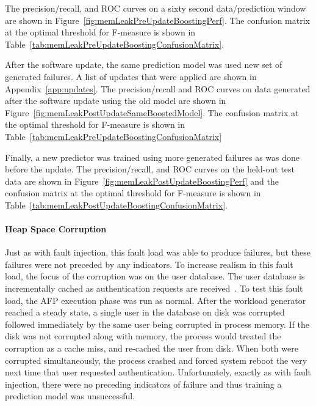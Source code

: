 The precision/recall, and \ac{ROC} curves on a sixty second data/prediction
window are shown in Figure~\ref{fig:memLeakPreUpdateBoostingPerf}.  The
confusion matrix at the optimal threshold for F-measure is shown in
Table~\ref{tab:memLeakPreUpdateBoostingConfusionMatrix}.

\figMemLeakPreUpdateBoostingPerf
\tabMemLeakPreUpdateBoostingConfusionMatrix

After the software update, the same prediction model was used new set of
generated failures.  A list of updates that were applied are shown in
Appendix~\ref{app:updates}.  The precision/recall and \ac{ROC} curves on data
generated after the software update using the old model are shown in
Figure~\ref{fig:memLeakPostUpdateSameBoostedModel}.  The confusion matrix at
the optimal threshold for F-measure is shown in
Table~\ref{tab:memLeakPreUpdateBoostingConfusionMatrix}

\figMemLeakPostUpdateSameBoostedModel
\tabMemLeakPostUpdateBoostingSameModelConfusionMatrix

Finally, a new predictor was trained using more generated failures as was done
before the update.  The precision/recall, and \ac{ROC} curves on the held-out
test data are shown in Figure~\ref{fig:memLeakPostUpdateBoostingPerf} and the
confusion matrix at the optimal threshold for F-measure is shown in
Table~\ref{tab:memLeakPostUpdateBoostingConfusionMatrix}.

\figMemLeakPostUpdateBoostingPerf
\tabMemLeakPostUpdateBoostingConfusionMatrix

\paragraph{Heap Space Corruption}
Just as with fault injection, this fault load was able to produce failures, but
these failures were not preceded by any indicators.  To increase realism in
this fault load, the focus of the corruption was on the user database.  The
user database is incrementally cached as authentication requests are
received~\cite{russinovich2009}.  To test this fault load, the \ac{AFP}
execution phase was run as normal.  After the workload generator reached a
steady state, a single user in the database on disk was corrupted followed
immediately by the same user being corrupted in process memory.  If the disk
was not corrupted along with memory, the process would treated the corruption
as a cache miss, and re-cached the user from disk.  When both were corrupted
simultaneously, the process crashed and forced system reboot the very next time
that user requested authentication.  Unfortunately, exactly as with fault
injection, there were no preceding indicators of failure and thus training a
prediction model was unsuccessful.

